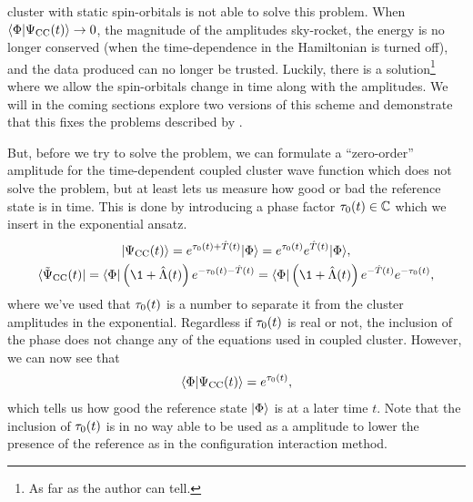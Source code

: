             cluster with static spin-orbitals is not able to solve this problem.
            When $\langle \Phi | \Psi_{\text{CC}}(t) \rangle \to 0$, the magnitude of the amplitudes
            sky-rocket, the energy is no longer conserved (when the
            time-dependence in the Hamiltonian is turned off), and the data
            produced can no longer be trusted.
            Luckily, there is a solution\footnote{
                As far as the author can tell.
            } where we allow the spin-orbitals change in time along with the
            amplitudes.
            We will in the coming sections explore two versions of this scheme
            and demonstrate that this fixes the problems described by
            \citeauthor{pedersen2018symplectic} \cite{pedersen2018symplectic}.

            But, before we try to solve the problem, we can formulate a
            ``zero-order'' amplitude for the time-dependent coupled cluster wave
            function which does not solve the problem, but at least lets us
            measure how good or bad the reference state is in time.
            This is done by introducing a phase factor $\tau_0(t) \in
            \mathbb{C}$ which we insert in the exponential ansatz.
            \begin{gather}
                \ket{\cc(t)}
                = e^{\clustamp_0(t) + \clust(t)}\ketslat
                = e^{\clustamp_0(t)} e^{\clust(t)}\ketslat,
                \\
                \bra{\bicc(t)}
                = \braslat\para{\1 + \clustl(t)}
                e^{-\clustamp_0(t) - \clust(t)}
                = \braslat\para{\1 + \clustl(t)}
                e^{-\clust(t)} e^{-\clustamp_0(t)},
            \end{gather}
            where we've used that $\tau_0(t)$ is a number to separate it
            from the cluster amplitudes in the exponential.
            Regardless if $\tau_0(t)$ is real or not, the inclusion of the
            phase does not change any of the equations used in coupled cluster.
            However, we can now see that
            \begin{align}
                \langle \Phi | \Psi_{\text{CC}}(t) \rangle = e^{\tau_0(t)},
            \end{align}
            which tells us how good the reference state $| \Phi \rangle$ is at a later
            time $t$.
            Note that the inclusion of $\tau_0(t)$ is in no way able to be
            used as a amplitude to lower the presence of the reference as in the
            configuration interaction method.
